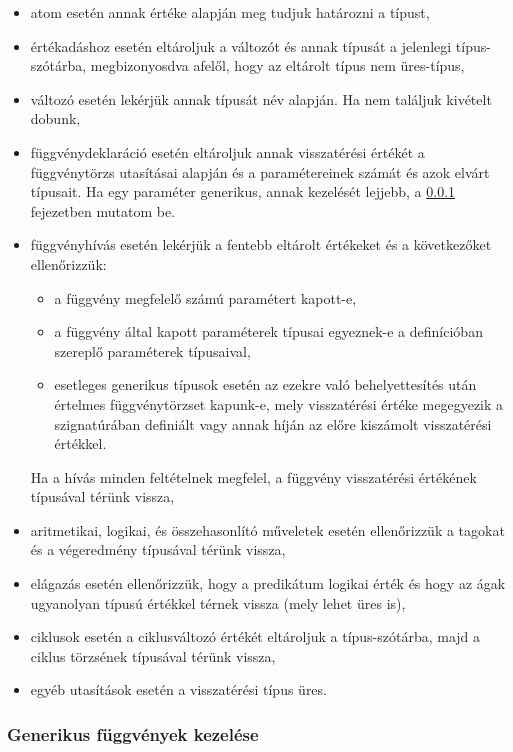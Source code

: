 \begin{itemize}
    \item atom esetén annak értéke alapján meg tudjuk határozni a típust,
    \item értékadáshoz esetén eltároljuk a változót és annak típusát a jelenlegi típus-szótárba, megbizonyosdva afelől, hogy az eltárolt típus nem üres-típus,
    \item változó esetén lekérjük annak típusát név alapján. Ha nem találjuk kivételt dobunk,
    \item függvénydeklaráció esetén eltároljuk annak visszatérési értékét a függvénytörzs utasításai alapján és a paramétereinek számát és azok elvárt típusait. Ha egy paraméter generikus, annak kezelését lejjebb, a \ref{sec:generic} fejezetben mutatom be.
    \item függvényhívás esetén lekérjük a fentebb eltárolt értékeket és a következőket ellenőrizzük:
    \begin{itemize}
        \item a függvény megfelelő számú paramétert kapott-e,
        \item a függvény által kapott paraméterek típusai egyeznek-e a definícióban szereplő paraméterek típusaival,
        \item esetleges generikus típusok esetén az ezekre való behelyettesítés után értelmes függvénytörzset kapunk-e, mely visszatérési értéke megegyezik a szignatúrában definiált vagy annak híján az előre kiszámolt visszatérési értékkel.
    \end{itemize}
    Ha a hívás minden feltételnek megfelel, a függvény visszatérési értékének típusával térünk vissza,
    \item aritmetikai, logikai, és összehasonlító műveletek esetén ellenőrizzük a tagokat és a végeredmény típusával térünk vissza,
    \item elágazás esetén ellenőrizzük, hogy a predikátum logikai érték és hogy az ágak ugyanolyan típusú értékkel térnek vissza (mely lehet üres is),
    \item ciklusok esetén a ciklusváltozó értékét eltároljuk a típus-szótárba, majd a ciklus törzsének típusával térünk vissza,
    \item egyéb utasítások esetén a visszatérési típus üres. 
\end{itemize}

\subsubsection{Generikus függvények kezelése}
\label{sec:generic}

